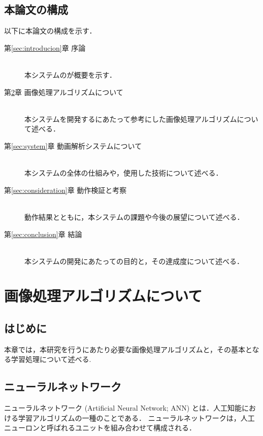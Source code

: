 \documentclass[a4j,12pt,dvipdfmx]{jreport}
\begin{document}
\clearpage

\section{本論文の構成}
以下に本論文の構成を示す．
\begin{description}
\item[第\ref{sec:introducion}章 \qquad 序論]\mbox{}\\
本システムのが概要を示す．

\item[第\ref{sec:algorithm}章 \qquad 画像処理アルゴリズムについて]\mbox{}\\
本システムを開発するにあたって参考にした画像処理アルゴリズムについて述べる．

\item[第\ref{sec:system}章 \qquad 動画解析システムについて]\mbox{}\\
本システムの全体の仕組みや，使用した技術について述べる．

\item[第\ref{sec:consideration}章 \qquad 動作検証と考察]\mbox{}\\
動作結果とともに，本システムの課題や今後の展望について述べる．

\item[第\ref{sec:conclusion}章 \qquad 結論]\mbox{}\\
本システムの開発にあたっての目的と，その達成度について述べる．

\end{description}

\clearpage

\chapter{画像処理アルゴリズムについて}
\label{sec:algorithm}

\section{はじめに}
本章では，本研究を行うにあたり必要な画像処理アルゴリズムと，その基本となる学習処理について述べる.

\section{ニューラルネットワーク}
ニューラルネットワーク (Artificial Neural Network; ANN) とは．人工知能における学習アルゴリズムの一種のことである\cite{ANN}．
ニューラルネットワークは，人工ニューロンと呼ばれるユニットを組み合わせて構成される．
\end{document}
